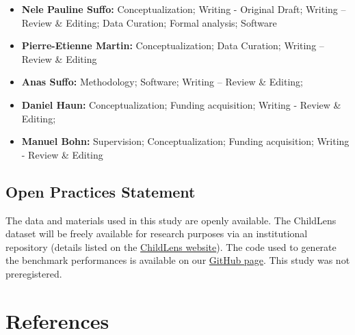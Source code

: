 \documentclass[
  man,floatsintext]{apa6}
\providecommand{\tightlist}{%
  \setlength{\itemsep}{0pt}\setlength{\parskip}{0pt}}
\begin{document}
\begin{itemize}
\tightlist
\item
  \textbf{Nele Pauline Suffo:} Conceptualization; Writing - Original Draft; Writing -- Review \& Editing; Data Curation; Formal analysis; Software
\item
  \textbf{Pierre-Etienne Martin:} Conceptualization; Data Curation; Writing -- Review \& Editing
\item
  \textbf{Anas Suffo:} Methodology; Software; Writing -- Review \& Editing;
\item
  \textbf{Daniel Haun:} Conceptualization; Funding acquisition; Writing - Review \& Editing;
\item
  \textbf{Manuel Bohn:} Supervision; Conceptualization; Funding acquisition; Writing - Review \& Editing
\end{itemize}

\subsection{Open Practices Statement}\label{open-practices-statement}

The data and materials used in this study are openly available. The ChildLens dataset will be freely available for research purposes via an institutional repository (details listed on the \href{https://www.eva.mpg.de/comparative-cultural-psychology/technical-development/childlens/}{ChildLens website}). The code used to generate the benchmark performances is available on our \href{https://github.com/neleSuffo/ChildLens}{GitHub page}. This study was not preregistered.

\newpage

\section{References}\label{references}

\begingroup
\setlength{\parindent}{-0.5in}
\setlength{\leftskip}{0.5in}
\end{document}
